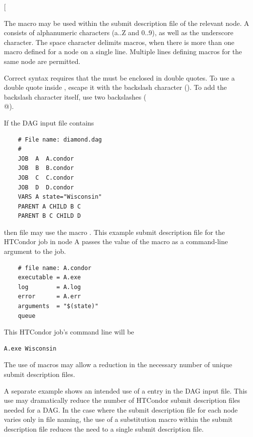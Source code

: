    [\Arg{"string"\Dots]}

The macro may be used within the
submit description file of the relevant node.  A 
consists of alphanumeric characters (a..Z and 0..9),
as well as the underscore character.
The space character delimits macros,
when there is more than one macro defined for a node on a single line.
Multiple lines defining macros for the same node are permitted.

Correct syntax requires that the  must be
enclosed in double quotes.
To use a double quote inside ,
escape it with the backslash character (\verb@\@).
To add the backslash character itself, use two backslashes (\verb@\\@).



If the DAG input file contains
\footnotesize
\begin{verbatim}
    # File name: diamond.dag
    #
    JOB  A  A.condor 
    JOB  B  B.condor 
    JOB  C  C.condor	
    JOB  D  D.condor
    VARS A state="Wisconsin"
    PARENT A CHILD B C
    PARENT B C CHILD D

\end{verbatim}
\normalsize

then file  may use the macro \verb@state@.
This example submit description file for the HTCondor
job in node A passes the value
of the macro as a command-line argument to the job.

\footnotesize
\begin{verbatim}
    # file name: A.condor
    executable = A.exe
    log        = A.log
    error      = A.err
    arguments  = "$(state)"
    queue
\end{verbatim}
\normalsize

This HTCondor job's command line will be
\footnotesize
\begin{verbatim}
A.exe Wisconsin
\end{verbatim}
\normalsize
The use of macros may allow a reduction in the necessary number 
of unique submit description files.

A separate example shows an intended use of a  entry
in the DAG input file.
This use may dramatically reduce the number of HTCondor submit description
files needed for a DAG.
In the case where the submit description file for each node
varies only in file naming, the use of a substitution macro
within the submit description file reduces the need to
a single submit description file.

